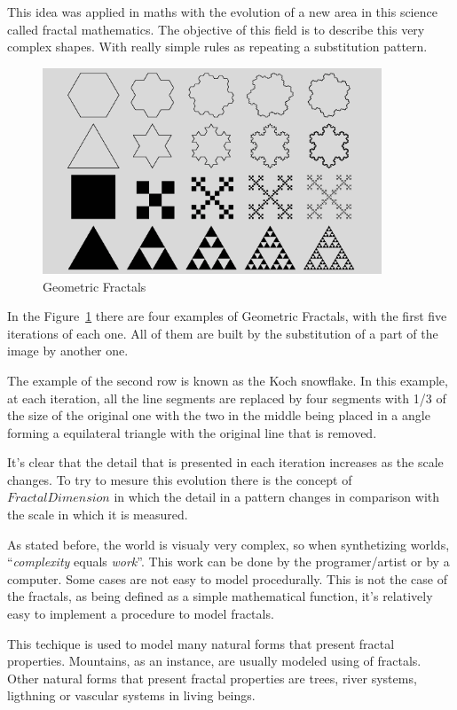 This idea was applied in maths with the evolution of a new area in this science called fractal mathematics. The objective of this field is to describe this very complex shapes. With really simple rules as repeating a substitution pattern. 

\begin{figure}[htbp]
	\centering
	\includegraphics[width=0.9\textwidth]{img/Theory/Fractals/Fractal1_1000.png}
	\caption{Geometric Fractals}
	\label{fig:GFractals}
\end{figure}

In the Figure~\ref{fig:GFractals} there are four examples of Geometric Fractals, with the first five iterations of each one. All of them are built by the substitution of a part of the image by another one. 

The example of the second row is known as the Koch snowflake. In this example, at each iteration, all the line segments are replaced by four segments with 1/3 of the size of the original one with the two in the middle being placed in a angle forming a equilateral triangle with the original line that is removed.

It's clear that the detail that is presented in each iteration increases as the scale changes. To try to mesure this evolution there is the concept of ​​$Fractal Dimension$ in which the detail in a pattern changes in comparison with the scale in which it is measured.

As stated before, the world is visualy very complex, so when synthetizing worlds, ``\emph{complexity} equals \emph{work}''\cite{Ebert2002}. This work can be done by the programer/artist or by a computer. Some cases are not easy to model procedurally. This is not the case of the fractals, as being defined as a simple mathematical function, it's relatively easy to implement a procedure to model fractals. 

This techique is used to model many natural forms that present fractal properties. Mountains, as an instance, are usually modeled using of fractals. Other natural forms that present fractal properties are trees, river systems, ligthning or vascular systems in living beings.





